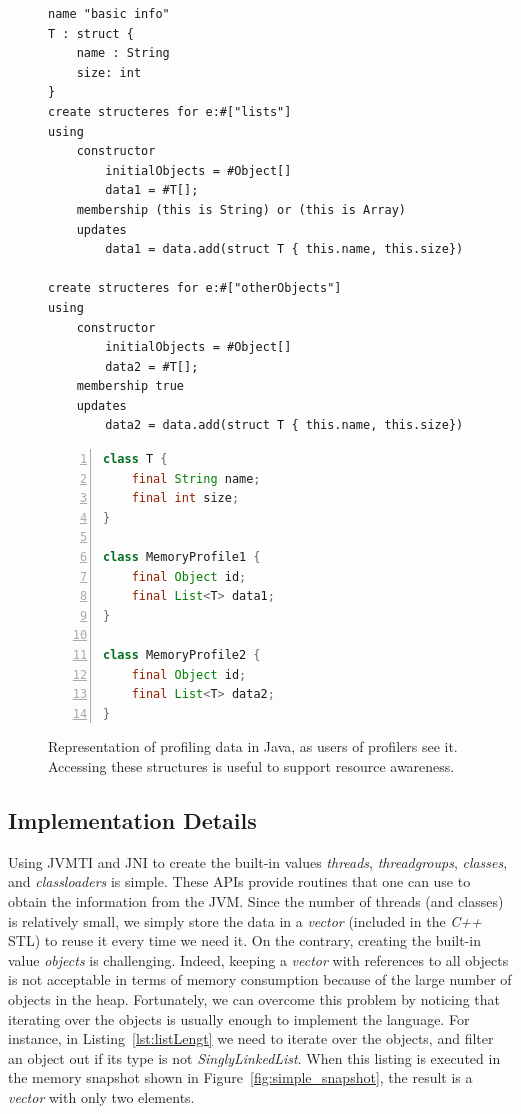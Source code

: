 \begin{figure}
\centering
\begin{minipage}[t]{0.60\linewidth}
\begin{lstlisting}[language=DSL2]
name "basic info" 
T : struct {
	name : String
	size: int
}
create structeres for e:#["lists"]
using
	constructor
		initialObjects = #Object[]
		data1 = #T[];
	membership (this is String) or (this is Array)
	updates
		data1 = data.add(struct T { this.name, this.size})
		
create structeres for e:#["otherObjects"]
using
	constructor
		initialObjects = #Object[]
		data2 = #T[];
	membership true
	updates
		data2 = data.add(struct T { this.name, this.size})
\end{lstlisting}
\end{minipage}
\hspace{0.07\linewidth}
\begin{minipage}[t]{0.30\linewidth}
\begin{lstlisting}[language=java, frame=L, numbers=left,numberstyle=\color{black}\scriptsize]
class T {
	final String name;
	final int size;
}

class MemoryProfile1 {
	final Object id;
	final List<T> data1;
}

class MemoryProfile2 {
	final Object id;
	final List<T> data2;
}
\end{lstlisting}
\end{minipage}
\caption{Representation of profiling data in Java, as users of profilers see it. Accessing these structures is useful to support resource awareness.} \label{fig:dsl-generated-java}
\end{figure}

\subsection{Implementation Details}
Using \gls{JVMTI} and \gls{JNI} to create the built-in values \textit{threads}, \textit{threadgroups}, \textit{classes}, and \textit{classloaders} is simple.
These APIs provide routines that one can use to obtain the information from the JVM.
Since the number of threads (and classes) is relatively small, we simply store the data in a \textit{vector} (included in the \textit{C++} \gls{STL}) to reuse it every time we need it.
On the contrary, creating the built-in value \textit{objects} is challenging.
Indeed, keeping a \textit{vector} with references to all objects is not acceptable in terms of memory consumption because of the large number of objects in the heap.
Fortunately, we can overcome this problem by noticing that iterating over the objects is usually enough to implement the language.
For instance, in Listing~\ref{lst:listLengt} we need to iterate over the objects, and filter an object out if its type is not \textit{SinglyLinkedList}.
When this listing is executed in the memory snapshot shown in Figure~\ref{fig:simple_snapshot}, the result is a \textit{vector} with only two elements.

